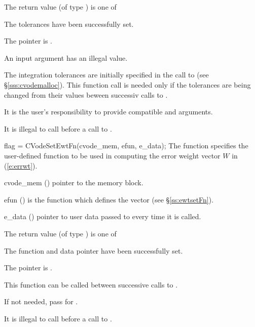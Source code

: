 {
  The return value  (of type ) is one of
  \begin{args}
  \item[\Id{CV\_SUCCESS}] 
    The tolerances have been successfully set.
  \item[\Id{CV\_MEM\_NULL}]
    The  pointer is .
  \item[\Id{CV\_ILL\_INPUT}]
    An input argument has an illegal value.
  \end{args}
}
{
  The integration tolerances are initially specified in the call
  to  (see \S\ref{sss:cvodemalloc}). This function call is
  needed only if the tolerances are being changed from their values beween
  successiv calls to .

  {\warn} It is the user's responsibility to provide compatible  and
   arguments.

  {\warn} It is illegal to call  before a call to 
  .
}
{
flag = CVodeSetEwtFn(cvode\_mem, efun, e\_data);
}
{
  The function  specifies the user-defined function
  to be used in computing the error weight vector $W$ in (\ref{e:errwt}).
}
{
  \begin{args}
  \item[cvode\_mem] ()
    pointer to the {\cvodes} memory block.
  \item[efun] () 
    is the {\C} function which defines the  vector (see \S\ref{ss:ewtsetFn}).
  \item[e\_data] ()
    pointer to user data passed to  every time it is called.
  \end{args}
}
{
  The return value  (of type ) is one of
  \begin{args}
  \item[\Id{CV\_SUCCESS}] 
     The function  and data pointer  have been successfully set.
  \item[\Id{CV\_MEM\_NULL}]
    The  pointer is .
  \end{args}
}
{
  This function can be called between successive calls to .
  
  If not needed, pass  for .

  {\warn} It is illegal to call  before a call to .
}

